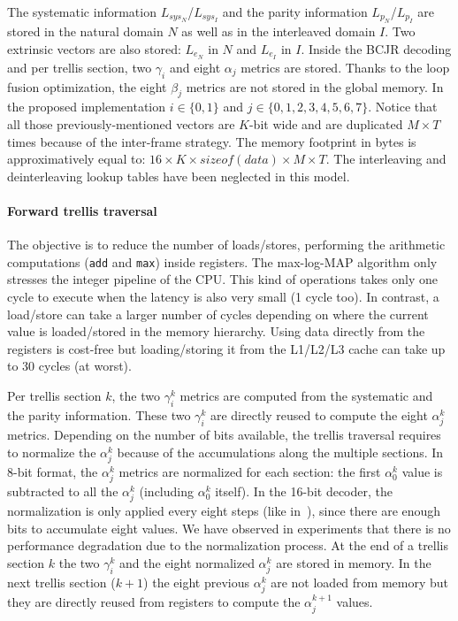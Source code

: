 The systematic information $L_{sys_N}$/$L_{sys_I}$ and the parity information
$L_{p_N}$/$L_{p_I}$  are stored in the natural domain $N$ as well as in the
interleaved domain $I$. Two extrinsic vectors are also stored: $L_{e_N}$ in $N$
and $L_{e_I}$ in $I$. Inside the BCJR decoding and per trellis section, two
$\gamma_{i}$ and eight $\alpha_{j}$ metrics are stored. Thanks to the loop
fusion optimization, the eight $\beta_j$ metrics are not stored in the global
memory. In the proposed implementation $i \in \{0,1\}$ and
$j \in \{0,1,2,3,4,5,6,7\}$. Notice that all those previously-mentioned vectors
are $K$-bit wide and are duplicated $M\times T$ times because of the inter-frame
strategy. The memory footprint in bytes is approximatively equal to:
$16 \times K \times sizeof(data) \times M \times T$.
The interleaving and deinterleaving lookup tables have been neglected in this
model.

\paragraph{Forward trellis traversal}

The objective is to reduce the number of loads/stores, performing the arithmetic
computations (\texttt{add} and \texttt{max}) inside registers. The max-log-MAP
algorithm only stresses the integer pipeline of the CPU. This kind of operations
takes only one cycle to execute when the latency is also very small (1 cycle
too). In contrast, a load/store can take a larger number of cycles depending on
where the current value is loaded/stored in the memory hierarchy. Using data
directly from the registers is cost-free but loading/storing it from the
L1/L2/L3 cache can take up to 30 cycles (at worst).

Per trellis section $k$, the two $\gamma_i^k$ metrics are computed from the
systematic and the parity information. These two $\gamma_i^k$ are directly
reused to compute the eight $\alpha_j^k$ metrics. Depending on the number of
bits available, the trellis traversal requires to normalize the $\alpha_j^k$
because of the accumulations along the multiple sections.  In 8-bit format, the
$\alpha_j^k$ metrics are normalized for each section: the first $\alpha_0^k$
value is subtracted to all the $\alpha_j^k$ (including $\alpha_0^k$ itself). In
the 16-bit decoder, the normalization is only applied every eight steps (like
in~\cite{Wu2013}), since there are enough bits to accumulate eight values. We
have observed in experiments that there is no performance degradation due to the
normalization process. At the end of a trellis section $k$ the two $\gamma_i^k$
and the eight normalized $\alpha_j^k$ are stored in  memory. In the next trellis
section ($k+1$) the eight previous $\alpha_j^k$ are not loaded from memory but
they are directly reused from registers to compute the $\alpha_j^{k+1}$ values.

